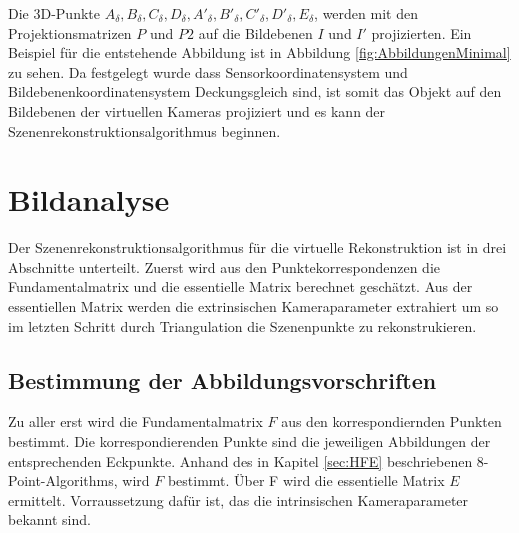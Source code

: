 
Die 3D-Punkte $A_\delta,B_\delta,C_\delta,D_\delta,A'_\delta,B'_\delta,C'_\delta,D'_\delta, E_\delta$, werden mit den Projektionsmatrizen \ensuremath{P} und \ensuremath{P2} auf die Bildebenen $I$ und $I'$ projizierten. Ein Beispiel für die entstehende Abbildung ist in Abbildung \ref{fig:AbbildungenMinimal} zu sehen. Da festgelegt wurde dass Sensorkoordinatensystem und Bildebenenkoordinatensystem Deckungsgleich sind, ist somit das Objekt auf den Bildebenen der virtuellen Kameras projiziert und es kann der Szenenrekonstruktionsalgorithmus beginnen.



\section{Bildanalyse}
\label{sec:MinimalFun}

Der Szenenrekonstruktionsalgorithmus für die virtuelle Rekonstruktion ist in drei Abschnitte unterteilt. Zuerst wird aus den Punktekorrespondenzen die Fundamentalmatrix und die essentielle Matrix berechnet geschätzt. Aus der essentiellen Matrix werden die extrinsischen Kameraparameter extrahiert um so im letzten Schritt durch Triangulation die Szenenpunkte zu rekonstrukieren. 

\subsection{Bestimmung der Abbildungsvorschriften}

Zu aller erst wird die Fundamentalmatrix $F$ aus den korrespondiernden Punkten bestimmt. Die korrespondierenden Punkte sind die jeweiligen Abbildungen der entsprechenden Eckpunkte. Anhand des in Kapitel \ref{sec:HFE} beschriebenen 8-Point-Algorithms, wird $F$ bestimmt. Über F wird die essentielle Matrix $E$ ermittelt. Vorraussetzung dafür ist, das die intrinsischen Kameraparameter bekannt sind.\\


